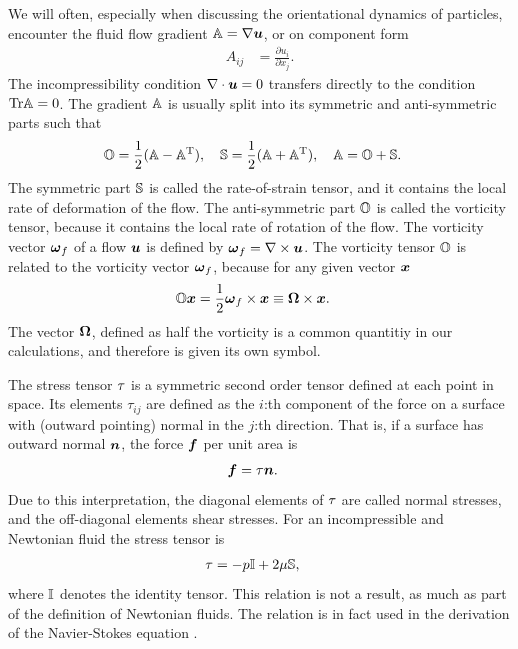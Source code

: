 \documentclass[thesis.tex]{subfiles}
\begin{document}
We will often, especially when discussing the orientational dynamics of particles, encounter the fluid flow gradient $\mathbb{A} = \nabla \mbox{\boldmath$u$}$, or on component form
\begin{align*}
	A_{ij} &= \frac{\partial u_i}{\partial x_j}.
\end{align*}
The incompressibility condition $\nabla\cdot\mbox{\boldmath$u$}=0$ transfers directly to the condition $\mbox{Tr} \mathbb{A}=0$. The gradient $\mathbb{A}$ is usually split into its symmetric and anti-symmetric parts such that
\begin{align*}
	&\mathbb{O} = \frac{1}{2}(\mathbb{A} - \mathbb{A}^{\mathrm T}),\quad
	\mathbb{S} = \frac{1}{2}(\mathbb{A} + \mathbb{A}^{\mathrm T}),\quad
	\mathbb{A} = \mathbb{O} + \mathbb{S}.
\end{align*}
The symmetric part $\mathbb{S}$ is called the rate-of-strain tensor, and it contains the local rate of deformation of the flow. The anti-symmetric part $\mathbb{O}$ is called the vorticity tensor, because it contains the local rate of rotation of the flow. The vorticity vector $\mbox{\boldmath$\omega$}_f$ of a flow $\mbox{\boldmath$u$}$ is defined by $\mbox{\boldmath$\omega$}_f = \nabla \times \mbox{\boldmath$u$}$. The vorticity tensor $\mathbb{O}$ is related to the vorticity vector $\mbox{\boldmath$\omega$}_f$, because for any given vector $\mbox{\boldmath$x$}$
\begin{align*}
	\mathbb{O} \mbox{\boldmath$x$} &= \frac{1}{2}\mbox{\boldmath$\omega$}_f \times \mbox{\boldmath$x$} \equiv \mbox{\boldmath$\Omega$} \times \mbox{\boldmath$x$}.
\end{align*}
The vector $\mbox{\boldmath$\Omega$}$, defined as half the vorticity is a common quantitiy in our calculations, and therefore is given its own symbol. 

The stress tensor $\mathbb{\tau}$ is a symmetric second order tensor defined at each point in space. Its elements $\tau_{ij}$ are defined as the $i$:th component of the force on a surface with (outward pointing) normal in the $j$:th direction. That is, if a surface has outward normal $\mbox{\boldmath$n$}$, the force $\mbox{\boldmath$f$}$ per unit area is
\begin{align*}
	\mbox{\boldmath$f$} &= \mathbb{\tau} \mbox{\boldmath$n$}.
\end{align*}
Due to this interpretation, the diagonal elements of $\mathbb{\tau}$ are called normal stresses, and the off-diagonal elements shear stresses. For an incompressible and Newtonian fluid the stress tensor is
\begin{align*}
	\mathbb{\tau} &= -p \mathbb{I} + 2\mu \mathbb{S},
\end{align*}
where $\mathbb{I}$ denotes the identity tensor. This relation is not a result, as much as part of the definition of Newtonian fluids. The relation is in fact used in the derivation of the Navier-Stokes equation . 
\end{document}
